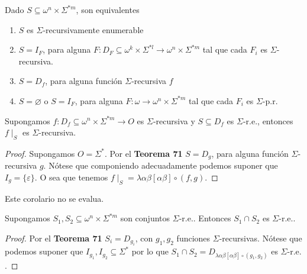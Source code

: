   \begin{theorem} Dado $S\subseteq \omega ^{n}\times \Sigma ^{\ast m} $, son equivalentes
    \begin{enumerate}
      \item $S$ es $\Sigma $-recursivamente enumerable
      \item $S=I_{F}$, para alguna $F:D_{F}\subseteq \omega ^{k}\times \Sigma ^{\ast l}\rightarrow \omega ^{n}\times
            \Sigma ^{\ast m}$ tal que cada $F_{i}$ es $\Sigma $-recursiva.
      \item $S=D_{f}$, para alguna función $\Sigma $-recursiva $f$
      \item $S=\varnothing $ o $S=I_{F}$, para alguna $F:\omega \rightarrow \omega ^{n}\times \Sigma ^{\ast m}$
            tal que cada $F_{i}$ es $\Sigma $-p.r.
    \end{enumerate}
  \end{theorem}


  \begin{corollary}
    Supongamos $f:D_{f}\subseteq \omega ^{n}\times \Sigma ^{\ast m}\rightarrow O$ es $\Sigma $-recursiva y
    $S\subseteq D_{f}$ es $ \Sigma $-r.e., entonces $f\mid _{S}$ es $\Sigma $-recursiva.
  \begin{proof}
    Supongamos $O=\Sigma ^{\ast }.$ Por el \textbf{Teorema 71} $S=D_{g}$, para alguna función
    $\Sigma $-recursiva $g.$ Nótese que componiendo adecuadamente podemos suponer que $I_{g}=\{\varepsilon \}.$
    O sea que tenemos $f\mid _{S}=\lambda \alpha \beta \left[ \alpha \beta \right] \circ (f,g)$.
  \end{proof}
  \end{corollary}


  \begin{corollary}
    \par Este corolario no se evalua.
  \end{corollary}

  \begin{corollary}
    Supongamos $S_{1},S_{2}\subseteq \omega ^{n}\times \Sigma ^{\ast m}$ son conjuntos $\Sigma $-r.e..
    Entonces $S_{1}\cap S_{2}$ es $\Sigma $-r.e..
  \begin{proof}
    Por el \textbf{Teorema 71} $S_{i}=D_{g_{i}}$, con $g_{1},g_{2}$ funciones $ \Sigma $-recursivas$.$
    Nótese que podemos suponer que $I_{g_{1}},I_{g_{2}} \subseteq \Sigma^{\ast} $ por lo que
    $S_{1}\cap S_{2}=D_{\lambda \alpha\beta \left[ \alpha\beta\right] \circ (g_{1},g_{2})}$ es $\Sigma $-r.e.$.$
  \end{proof}
  \end{corollary}

